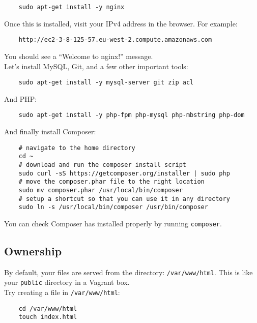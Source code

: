 \begin{verbatim}
    sudo apt-get install -y nginx
\end{verbatim}

Once this is installed, visit your IPv4 address in the browser. For example:

\begin{verbatim}
    http://ec2-3-8-125-57.eu-west-2.compute.amazonaws.com
\end{verbatim}

You should see a ``Welcome to nginx!'' message.
\\

Let's install MySQL, Git, and a few other important tools:

\begin{verbatim}
    sudo apt-get install -y mysql-server git zip acl
\end{verbatim}

And PHP:

\begin{verbatim}
    sudo apt-get install -y php-fpm php-mysql php-mbstring php-dom
\end{verbatim}


And finally install Composer:

\begin{verbatim}
    # navigate to the home directory
    cd ~
    # download and run the composer install script
    sudo curl -sS https://getcomposer.org/installer | sudo php
    # move the composer.phar file to the right location
    sudo mv composer.phar /usr/local/bin/composer
    # setup a shortcut so that you can use it in any directory
    sudo ln -s /usr/local/bin/composer /usr/bin/composer
\end{verbatim}

You can check Composer has installed properly by running \texttt{composer}.


\subsection{Ownership}

By default, your files are served from the directory: \texttt{/var/www/html}. This is like your \texttt{public} directory in a Vagrant box.
\\

Try creating a file in \texttt{/var/www/html}:

\begin{verbatim}
    cd /var/www/html
    touch index.html
\end{verbatim}

